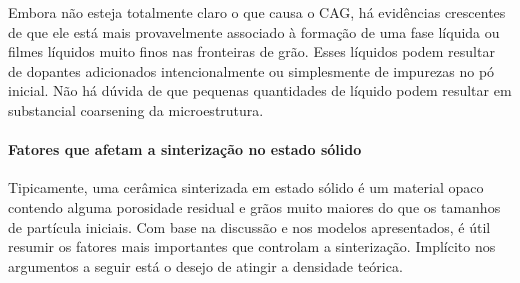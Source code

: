 Embora não esteja totalmente claro o que causa o CAG, há evidências crescentes de que ele está mais provavelmente associado à formação de uma fase líquida ou filmes líquidos muito finos nas fronteiras de grão. Esses líquidos podem resultar de dopantes adicionados intencionalmente ou simplesmente de impurezas no pó inicial. Não há dúvida de que pequenas quantidades de líquido podem resultar em substancial coarsening da microestrutura.

\paragraph*{Fatores que afetam a sinterização no estado sólido}

Tipicamente, uma cerâmica sinterizada em estado sólido é um material opaco contendo alguma porosidade residual e grãos muito maiores do que os tamanhos de partícula iniciais. Com base na discussão e nos modelos apresentados, é útil resumir os fatores mais importantes que controlam a sinterização. Implícito nos argumentos a seguir está o desejo de atingir a densidade teórica.

